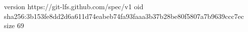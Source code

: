 version https://git-lfs.github.com/spec/v1
oid sha256:3b153fe8dd2d6a611d74eabeb74fa93faaa3b37b28be80f5807a7b9639ccc7ec
size 69
